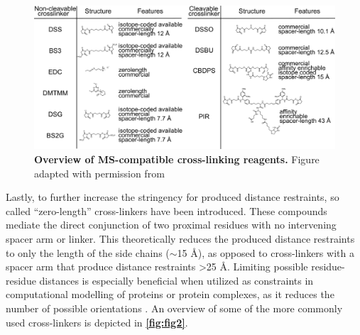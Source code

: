 \begin{figure}[hbt]
    \center
    \includegraphics[]{Chapter.1/Figures/Figure2.png}
    \caption{\textbf{Overview of MS-compatible cross-linking reagents.} Figure adapted with permission from \cite{Steigenberger_2020}}
    \label{fig:fig2}
\end{figure}
Lastly, to further increase the stringency for produced distance restraints, so called “zero-length” cross-linkers have been introduced. These compounds mediate the direct conjunction of two proximal residues with no intervening spacer arm or linker. This theoretically reduces the produced distance restraints to only the length of the side chains ($\sim$15 Å), as opposed to cross-linkers with a spacer arm that produce distance restraints >25 Å. Limiting possible residue-residue distances is especially beneficial when utilized as constraints in computational modelling of proteins or protein complexes, as it reduces the number of possible orientations \cite{Leitner_2014}. An overview of some of the more commonly used cross-linkers is depicted in \textbf{\autoref{fig:fig2}}.
%
